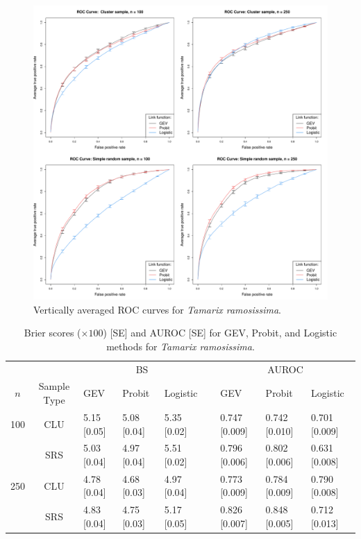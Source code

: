 \documentclass[11pt]{article}
\begin{document}
\begin{figure}
  \includegraphics[width=\linewidth]{plots/data-perf-species1}
  \caption{Vertically averaged ROC curves for \emph{Tamarix ramosissima}.}
  \label{rbfig:simrocgev}
\end{figure}

\begin{table}
  \caption{Brier scores ($\times 100$) [SE] and AUROC [SE] for GEV, Probit, and Logistic methods for \emph{Tamarix ramosissima}.}
  \label{rbtbl:simbsresults}
  \centering
  \footnotesize
  \begin{tabular}{cclllclll}
  \toprule
    \multicolumn{2}{c}{ }& \multicolumn{3}{c}{BS} & \phantom{abc} & \multicolumn{3}{c}{AUROC}\\
    \cmidrule{3-5} \cmidrule{7-9}
    \multicolumn{1}{c}{$n$} & \multicolumn{1}{c}{Sample Type} & GEV    & Probit & Logistic & \phantom{abc} & GEV    & Probit & Logistic \\
  \midrule
  100 & CLU & 5.15 [0.05] & 5.08 [0.04] & 5.35 [0.02] && 0.747 [0.009] & 0.742
      [0.010] & 0.701 [0.009]\\
      & SRS & 5.03 [0.04] & 4.97 [0.04] & 5.51 [0.02] && 0.796 [0.006] & 0.802
      [0.006] & 0.631 [0.008]\\
  250 & CLU & 4.78 [0.04] & 4.68 [0.03] & 4.97 [0.04] && 0.773 [0.009] & 0.784
      [0.009] & 0.790 [0.008]\\
      & SRS & 4.83 [0.04] & 4.75 [0.03] & 5.17 [0.05] && 0.826 [0.007] & 0.848
      [0.005] & 0.712 [0.013]\\
  \bottomrule
  \end{tabular}
\end{table}
\end{document}
